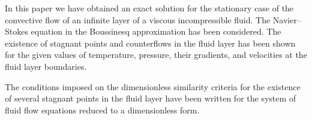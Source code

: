 \newpage




In this paper we have obtained an exact solution for the stationary case of the convective flow of an infinite layer of a viscous incompressible fluid. The Navier--Stokes equation in the Boussinesq approximation has been considered. The existence of stagnant points and counterflows in the fluid layer has been shown for the given values of temperature, pressure, their gradients, and velocities at the fluid layer boundaries. 



The conditions imposed on the dimensionless similarity criteria for the existence of several stagnant points in the fluid layer have been written for the system of fluid flow equations reduced to a dimensionless form. 


















